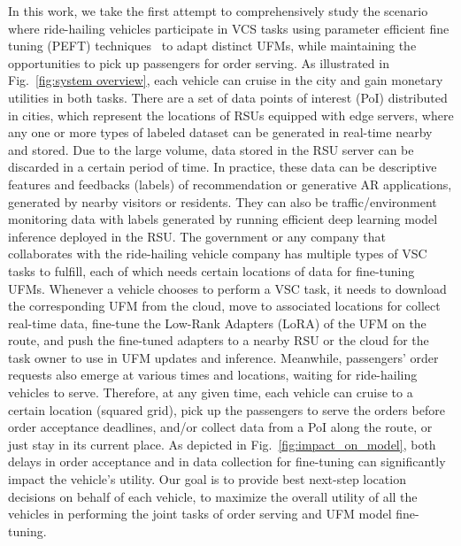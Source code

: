  In this work, we take the first attempt to comprehensively study the scenario where ride-hailing vehicles participate in VCS tasks using parameter efficient fine tuning (PEFT) techniques~\cite{han2024parameter} to adapt distinct UFMs, while maintaining the opportunities to pick up passengers for order serving. As illustrated in Fig.~\ref{fig:system overview}, each vehicle can cruise in the city and gain monetary utilities in both tasks. There are a set of data points of interest (PoI) distributed in cities, which represent the locations of RSUs equipped with edge servers, where any one or more types of labeled dataset can be generated in real-time nearby and stored. Due to the large volume, data stored in the RSU server can be discarded in a certain period of time. In practice, these data can be descriptive features and feedbacks (labels) of recommendation or generative AR applications, generated by nearby visitors or residents. They can also be traffic/environment monitoring data with labels generated by running efficient deep learning model inference deployed in the RSU. The government or any company that collaborates with the ride-hailing vehicle company has multiple types of VSC tasks to fulfill, each of which needs certain locations of data for fine-tuning UFMs. Whenever a vehicle chooses to perform a VSC task, it needs to download the corresponding UFM from the cloud, move to associated locations for collect real-time data, fine-tune the Low-Rank Adapters (LoRA) of the UFM on the route, and push the fine-tuned adapters to a nearby RSU or the cloud for the task owner to use in UFM updates and inference.
Meanwhile, passengers' order requests also emerge at various times and locations, waiting for ride-hailing vehicles to serve. Therefore, at any given time, each vehicle can cruise to a certain location (squared grid), pick up the passengers to serve the orders before order acceptance deadlines, and/or collect data from a PoI along the route, or just stay in its current place. As depicted in Fig.~\ref{fig:impact_on_model}, both delays in order acceptance and in data collection for fine-tuning can significantly impact the vehicle's utility. Our goal is to provide best next-step location decisions on behalf of each vehicle, to maximize the overall utility of all the vehicles in performing the joint tasks of order serving and UFM model fine-tuning. 

